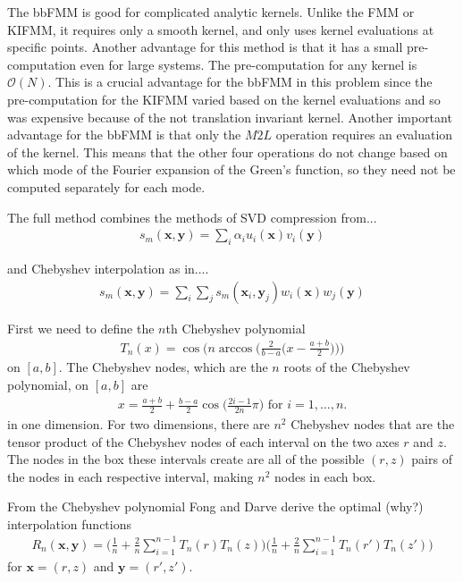 \documentclass[11pt, oneside]{article}   	%
\begin{document}
The bbFMM is good for complicated analytic kernels. Unlike the FMM or KIFMM, it requires only a smooth kernel, and only uses kernel evaluations at specific points. Another advantage for this method is that it has a small pre-computation even for large systems. The pre-computation for any kernel is $\mathcal{O}(N)$. This is a crucial advantage for the bbFMM in this problem since the pre-computation for the KIFMM varied based on the kernel evaluations and so was expensive because of the not translation invariant kernel. Another important advantage for the bbFMM is that only the $M2L$ operation requires an evaluation of the kernel. This means that the other four operations do not change based on which mode of the Fourier expansion of the Green's function, so they need not be computed separately for each mode.

The full method combines the methods of SVD compression from...
\begin{align}
s_m(\mathbf{x},\mathbf{y})=\sum_i \alpha_i u_i(\mathbf{x})v_i(\mathbf{y})
\end{align}

and Chebyshev interpolation as in....
\begin{align}
s_m(\mathbf{x},\mathbf{y})=\sum_i\sum_j s_m(\mathbf{x}_i,\mathbf{y}_j)w_i(\mathbf{x})w_j(\mathbf{y})
\end{align}

First we need to define the $n$th Chebyshev polynomial
\begin{align}
T_n(x)=\cos\bigg(n\arccos\bigg(\frac{2}{b-a}\bigg(x-\frac{a+b}{2}\bigg)\bigg)\bigg)
\end{align}
on $[a,b]$. The Chebyshev nodes, which are the $n$ roots of the Chebyshev polynomial, on $[a,b]$ are
\begin{align}
x=\frac{a+b}{2}+\frac{b-a}{2}\cos\bigg(\frac{2i-1}{2n}\pi\bigg)\mbox{ for }i=1,\dots,n.
\end{align}
in one dimension. For two dimensions, there are $n^2$ Chebyshev nodes that are the tensor product of the Chebyshev nodes of each interval on the two axes $r$ and $z$. The nodes in the box these intervals create are all of the possible $(r,z)$ pairs of the nodes in each respective interval, making $n^2$ nodes in each box.

From the Chebyshev polynomial Fong and Darve derive the optimal (why?) interpolation functions
\begin{align}
R_n(\mathbf{x},\mathbf{y}) = \bigg(\frac{1}{n} + \frac{2}{n}\sum_{i=1}^{n-1}T_n(r)T_n(z)\bigg)\bigg(\frac{1}{n} + \frac{2}{n}\sum_{i=1}^{n-1}T_n(r')T_n(z')\bigg)
\end{align}
for $\mathbf{x}=(r,z)$ and $\mathbf{y}=(r',z')$.
\end{document}
